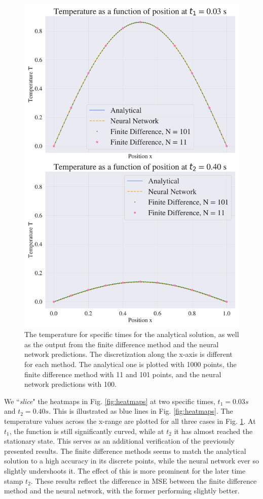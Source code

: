 \begin{figure}[h!]
    \centering
    \includegraphics[width=1.0\linewidth]{project_3/plots/time_slices_comparison.pdf}
    \caption{The temperature for specific times for the analytical solution, as well as the output from the finite difference method and the neural network predictions. The discretization along the x-axis is different for each method. The analytical one is plotted with 1000 points, the finite difference method with 11 and 101 points, and the neural network predictions with 100. }
    \label{fig:timeslices}
\end{figure}


We ``\textit{slice}" the heatmaps in Fig. \ref{fig:heatmaps} at two specific times, $t_1 = 0.03 s$ and $t_2 = 0.40 s$. 
This is illustrated as blue lines in Fig. \ref{fig:heatmaps}.
The temperature values across the x-range are plotted for all three cases in Fig. \ref{fig:timeslices}.
At $t_1$, the function is still significantly curved, while at $t_2$ it has almost reached the stationary state.
This serves as an additional verification of the previously presented results. 
The finite difference methods seems to match the analytical solution to a high accuracy in its discrete points, while the neural network ever so slightly undershoots it.
The effect of this is more prominent for the later time stamp $t_2$. 
These results reflect the difference in MSE between the finite difference method and the neural network, with the former performing slightly better. 

